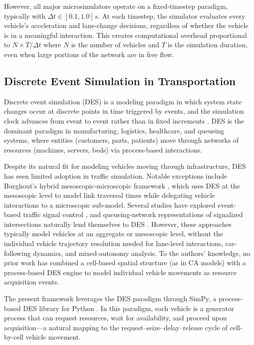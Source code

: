\documentclass[review,authoryear]{elsarticle}
\begin{document}
However, all major microsimulators operate on a fixed-timestep paradigm, typically with $\Delta t \in [0.1, 1.0]$\,s. At each timestep, the simulator evaluates every vehicle's acceleration and lane-change decisions, regardless of whether the vehicle is in a meaningful interaction. This creates computational overhead proportional to $N \times T / \Delta t$ where $N$ is the number of vehicles and $T$ is the simulation duration, even when large portions of the network are in free flow.

\subsection{Discrete Event Simulation in Transportation}
\label{sec:lit_des}

Discrete event simulation (DES) is a modeling paradigm in which system state changes occur at discrete points in time triggered by events, and the simulation clock advances from event to event rather than in fixed increments \citep{banks2014discrete}. DES is the dominant paradigm in manufacturing, logistics, healthcare, and queueing systems, where entities (customers, parts, patients) move through networks of resources (machines, servers, beds) via process-based interactions.

Despite its natural fit for modeling vehicles moving through infrastructure, DES has seen limited adoption in traffic simulation. Notable exceptions include Burghout's hybrid mesoscopic-microscopic framework \citep{burghout2005hybrid}, which uses DES at the mesoscopic level to model link traversal times while delegating vehicle interactions to a microscopic sub-model. Several studies have explored event-based traffic signal control \citep{barcelo2005fundamentals}, and queueing-network representations of signalized intersections naturally lend themselves to DES \citep{osorio2015urban}. However, these approaches typically model vehicles at an aggregate or mesoscopic level, without the individual vehicle trajectory resolution needed for lane-level interactions, car-following dynamics, and mixed-autonomy analysis. To the authors' knowledge, no prior work has combined a cell-based spatial structure (as in CA models) with a process-based DES engine to model individual vehicle movements as resource acquisition events.

The present framework leverages the DES paradigm through SimPy, a process-based DES library for Python \citep{simpy2023}. In this paradigm, each vehicle is a generator process that can request resources, wait for availability, and proceed upon acquisition---a natural mapping to the request--seize--delay--release cycle of cell-by-cell vehicle movement.
\end{document}

